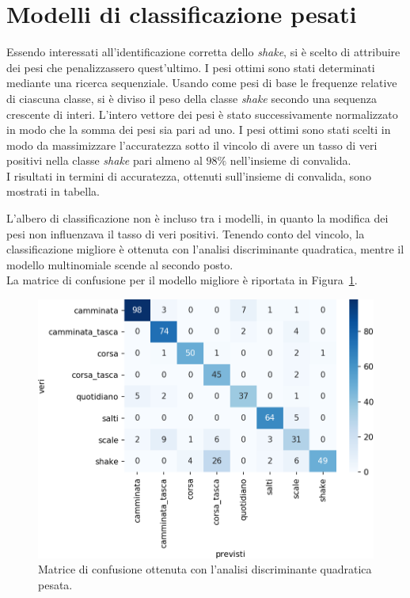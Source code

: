 \documentclass[main.tex]{subfiles}
\begin{document}
\section{Modelli di classificazione pesati}

Essendo interessati all\rq{}identificazione corretta dello {\em shake}, si è scelto di attribuire dei pesi che penalizzassero quest\rq{}ultimo. I pesi ottimi sono stati determinati mediante una ricerca sequenziale. Usando come pesi di base le frequenze relative di ciascuna classe, si è diviso il peso della classe {\em shake} secondo una sequenza crescente di interi. L'intero vettore dei pesi è stato successivamente normalizzato in modo che la somma dei pesi sia pari ad uno. I pesi ottimi sono stati scelti in modo da massimizzare l\rq{}accuratezza sotto il vincolo di avere un tasso di veri positivi nella classe {\em shake} pari almeno al $98\%$ nell\rq{}insieme di convalida.\\
I risultati in termini di accuratezza, ottenuti sull\rq{}insieme di convalida, sono mostrati in tabella.

L'albero di classificazione non è incluso tra i modelli, in quanto la modifica dei pesi non influenzava il tasso di veri positivi. Tenendo conto del vincolo, la classificazione migliore è ottenuta con l\rq{}analisi discriminante quadratica, mentre il modello multinomiale scende al secondo posto.\\

La matrice di confusione per il modello migliore è riportata in Figura~\ref{fig:qda_pen}.
\begin{figure}[H]
	\centering
	\includegraphics[width=\confusion]{../../figure/confusionMatrix-QDA-penalizzata.png}
	\caption{Matrice di confusione ottenuta con l'analisi discriminante quadratica pesata.}
	\label{fig:qda_pen}
\end{figure}
\end{document}
